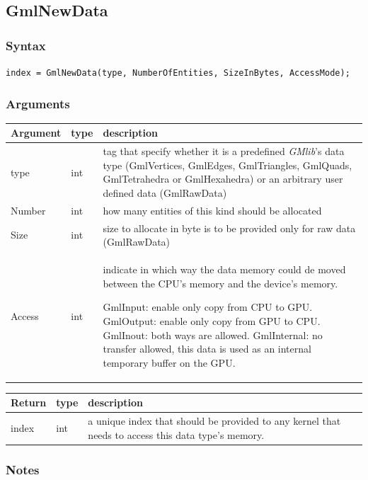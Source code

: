 \documentclass[a4paper,12pt]{article}
\begin{document}
\subsection{GmlNewData}
\subsubsection*{Syntax}

{\tt index = GmlNewData(type, NumberOfEntities, SizeInBytes, AccessMode);}
\subsubsection*{Arguments}

\begin{tabular}{|m{2cm}|m{1.5cm}|m{10.5cm}|}
\hline
Argument   & type   & description \\
\hline
type       & int    & tag that specify whether it is a predefined \emph{GMlib}'s data type (GmlVertices, GmlEdges, GmlTriangles, GmlQuads, GmlTetrahedra or GmlHexahedra) or an arbitrary user defined data (GmlRawData) \\
\hline
Number     & int    & how many entities of this kind should be allocated \\
\hline
Size       & int    & size to allocate in byte is to be provided only for raw data (GmlRawData) \\
\hline
Access     & int    & indicate in which way the data memory could de moved between the CPU's memory and the device's memory.

GmlInput: enable only copy from CPU to GPU.
GmlOutput: enable only copy from GPU to CPU.
GmlInout: both ways are allowed.
GmlInternal: no transfer allowed, this data is used as an internal temporary buffer on the GPU.\\
\hline
\end{tabular}

\medskip

\begin{tabular}{|m{2cm}|m{1.5cm}|m{10.5cm}|}
\hline
Return  & type & description \\
\hline
index   & int  & a unique index that should be provided to any kernel that needs to access this data type's memory.\\
\hline
\end{tabular}

\subsubsection*{Notes}
\end{document}
